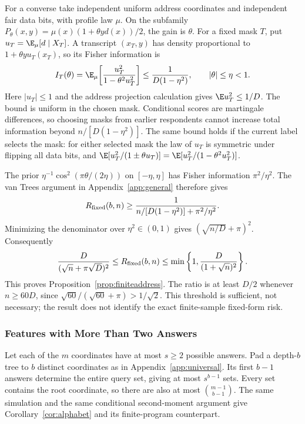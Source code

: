 For a converse take independent uniform address coordinates and independent fair data bits, with profile law $\mu$. On the subfamily $P_\theta(x,y)=\mu(x)(1+\theta y d(x))/2$, the gain is $\theta$. For a fixed mask $T$, put $u_T=\E_\mu[d\mid X_T]$. A transcript $(x_T,y)$ has density proportional to $1+\theta y u_T(x_T)$, so its Fisher information is
\[
 I_T(\theta)=\E_\mu\!\left[\frac{u_T^2}{1-\theta^2u_T^2}\right]
 \le\frac{1}{D(1-\eta^2)},\qquad |\theta|\le\eta<1.
\]
Here $|u_T|\le1$ and the address projection calculation gives $\E u_T^2\le1/D$. The bound is uniform in the chosen mask. Conditional scores are martingale differences, so choosing masks from earlier respondents cannot increase total information beyond $n/[D(1-\eta^2)]$. The same bound holds if the current label selects the mask: for either selected mask the law of $u_T$ is symmetric under flipping all data bits, and $\E[u_T^2/(1\pm\theta u_T)]=\E[u_T^2/(1-\theta^2u_T^2)]$.

The prior $\eta^{-1}\cos^2(\pi\theta/(2\eta))$ on $[-\eta,\eta]$ has Fisher information $\pi^2/\eta^2$. The van Trees argument in Appendix~\ref{app:general} therefore gives
\[
 R_{\rm fixed}(b,n)\ge
 \frac{1}{n/[D(1-\eta^2)]+\pi^2/\eta^2}.
\]
Minimizing the denominator over $\eta^2\in(0,1)$ gives $(\sqrt{n/D}+\pi)^2$. Consequently
\[
 \frac{D}{(\sqrt n+\pi\sqrt D)^2}
 \le R_{\rm fixed}(b,n)
 \le\min\left\{1,\frac{D}{(1+\sqrt n)^2}\right\}.
\]
This proves Proposition~\ref{prop:finiteaddress}. The ratio is at least $D/2$ whenever $n\ge60D$, since $\sqrt{60}/(\sqrt{60}+\pi)>1/\sqrt2$. This threshold is sufficient, not necessary; the result does not identify the exact finite-sample fixed-form risk.

\subsubsection{Features with More Than Two Answers}\label{app:alphabet}
Let each of the $m$ coordinates have at most $s\ge2$ possible answers. Pad a depth-$b$ tree to $b$ distinct coordinates as in Appendix~\ref{app:universal}. Its first $b-1$ answers determine the entire query set, giving at most $s^{b-1}$ sets. Every set contains the root coordinate, so there are also at most $\binom{m-1}{b-1}$. The same simulation and the same conditional second-moment argument give Corollary~\ref{cor:alphabet} and its finite-program counterpart.

